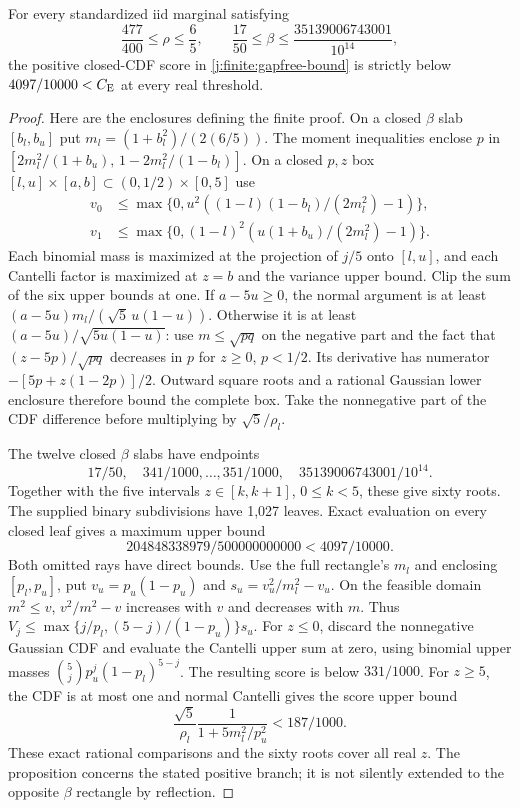\begin{proposition}
\label{j:finite:gapfree5-result}
For every standardized iid marginal satisfying
\[
 \frac{477}{400}\le\rho\le\frac65,\qquad
 \frac{17}{50}\le\beta\le\frac{35139006743001}{10^{14}},
\]
the positive closed-CDF score in \eqref{j:finite:gapfree-bound} is strictly
below $4097/10000<C_{\mathrm E}$ at every real threshold.
\end{proposition}
\begin{proof}
Here are the enclosures defining the finite proof. On a closed
$\beta$ slab $[b_l,b_u]$ put $m_l=(1+b_l^2)/(2(6/5))$.
The moment inequalities enclose $p$ in
$[2m_l^2/(1+b_u),\,1-2m_l^2/(1-b_l)]$.
On a closed $p,z$ box $[l,u]\times[a,b]\subset(0,1/2)\times[0,5]$
use
\begin{align*}
 v_0&\le\max\{0,u^2((1-l)(1-b_l)/(2m_l^2)-1)\},\\
 v_1&\le\max\{0,(1-l)^2(u(1+b_u)/(2m_l^2)-1)\}.
\end{align*}
Each binomial mass is maximized at the projection of $j/5$ onto
$[l,u]$, and each Cantelli factor is maximized at $z=b$ and the
variance upper bound. Clip the sum of the six upper bounds at one.
If $a-5u\ge0$, the normal argument is at least
$(a-5u)m_l/(\sqrt5\,u(1-u))$.
Otherwise it is at least $(a-5u)/\sqrt{5u(1-u)}$: use
$m\le\sqrt{pq}$ on the negative part and the fact that
$(z-5p)/\sqrt{pq}$ decreases in $p$ for $z\ge0$, $p<1/2$.
Its derivative has numerator $-[5p+z(1-2p)]/2$.
Outward square roots and a rational Gaussian lower enclosure therefore
bound the complete box. Take the nonnegative part of the CDF difference
before multiplying by $\sqrt5/\rho_l$.

The twelve closed $\beta$ slabs have endpoints
\[
 17/50,\quad 341/1000,\ldots,351/1000,\quad
 35139006743001/10^{14}.
\]
Together with the five intervals $z\in[k,k+1]$, $0\le k<5$, these
give sixty roots. The supplied binary subdivisions have 1,027 leaves.
Exact evaluation on every closed leaf gives a maximum upper bound
\[
 204848338979/500000000000<4097/10000.
\]
Both omitted rays have direct bounds. Use the full rectangle's $m_l$
and enclosing $[p_l,p_u]$, put $v_u=p_u(1-p_u)$ and
$s_u=v_u^2/m_l^2-v_u$. On the feasible domain $m^2\le v$,
$v^2/m^2-v$ increases with $v$ and decreases with $m$. Thus
$V_j\le\max\{j/p_l,(5-j)/(1-p_u)\}s_u$.
For $z\le0$, discard the nonnegative Gaussian CDF and evaluate the
Cantelli upper sum at zero, using binomial upper masses
$\binom5j p_u^j(1-p_l)^{5-j}$. The resulting score is below $331/1000$.
For $z\ge5$, the CDF is at most one and normal Cantelli gives the
score upper bound
\[
 \frac{\sqrt5}{\rho_l}\frac1{1+5m_l^2/p_u^2}<187/1000.
\]
These exact rational comparisons and the sixty roots cover all real $z$.
The proposition concerns the stated positive branch; it is not silently
extended to the opposite $\beta$ rectangle by reflection.
\end{proof}

